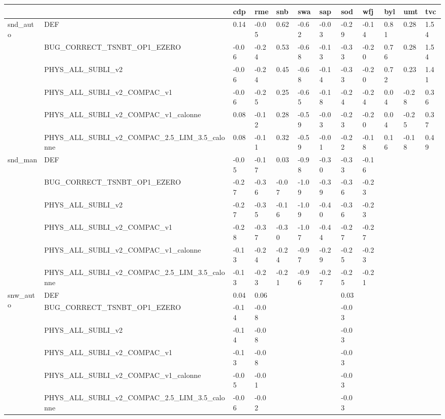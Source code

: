 \begin{tabular}{llllllllllll}
\toprule
 &  & cdp & rme & snb & swa & sap & sod & wfj & byl & umt & tvc \\
\midrule
\multirow[t]{6}{*}{snd_auto} & DEF & 0.14 & -0.05 & 0.62 & -0.62 & -0.03 & -0.29 & -0.14 & 0.81 & 0.28 & 1.54 \\
 & BUG_CORRECT_TSNBT_OP1_EZERO & -0.06 & -0.24 & 0.53 & -0.68 & -0.13 & -0.33 & -0.20 & 0.76 & 0.28 & 1.54 \\
 & PHYS_ALL_SUBLI_v2 & -0.06 & -0.24 & 0.45 & -0.68 & -0.14 & -0.33 & -0.20 & 0.72 & 0.23 & 1.41 \\
 & PHYS_ALL_SUBLI_v2_COMPAC_v1 & -0.06 & -0.25 & 0.25 & -0.65 & -0.18 & -0.24 & -0.24 & 0.04 & -0.28 & 0.36 \\
 & PHYS_ALL_SUBLI_v2_COMPAC_v1_calonne & 0.08 & -0.12 & 0.28 & -0.59 & -0.03 & -0.23 & -0.20 & 0.04 & -0.25 & 0.37 \\
 & PHYS_ALL_SUBLI_v2_COMPAC_2.5_LIM_3.5_calonne & 0.08 & -0.11 & 0.32 & -0.59 & -0.01 & -0.22 & -0.18 & 0.16 & -0.18 & 0.49 \\
\cline{1-12}
\multirow[t]{6}{*}{snd_man} & DEF & -0.05 & -0.17 & 0.03 & -0.98 & -0.30 & -0.33 & -0.16 &  &  &  \\
 & BUG_CORRECT_TSNBT_OP1_EZERO & -0.27 & -0.36 & -0.07 & -1.09 & -0.39 & -0.36 & -0.23 &  &  &  \\
 & PHYS_ALL_SUBLI_v2 & -0.27 & -0.35 & -0.16 & -1.09 & -0.40 & -0.36 & -0.23 &  &  &  \\
 & PHYS_ALL_SUBLI_v2_COMPAC_v1 & -0.28 & -0.37 & -0.30 & -1.07 & -0.44 & -0.27 & -0.27 &  &  &  \\
 & PHYS_ALL_SUBLI_v2_COMPAC_v1_calonne & -0.13 & -0.24 & -0.24 & -0.97 & -0.29 & -0.25 & -0.23 &  &  &  \\
 & PHYS_ALL_SUBLI_v2_COMPAC_2.5_LIM_3.5_calonne & -0.13 & -0.23 & -0.21 & -0.96 & -0.27 & -0.25 & -0.21 &  &  &  \\
\cline{1-12}
\multirow[t]{6}{*}{snw_auto} & DEF & 0.04 & 0.06 &  &  &  & 0.03 &  &  &  &  \\
 & BUG_CORRECT_TSNBT_OP1_EZERO & -0.14 & -0.08 &  &  &  & -0.03 &  &  &  &  \\
 & PHYS_ALL_SUBLI_v2 & -0.14 & -0.08 &  &  &  & -0.03 &  &  &  &  \\
 & PHYS_ALL_SUBLI_v2_COMPAC_v1 & -0.13 & -0.08 &  &  &  & -0.03 &  &  &  &  \\
 & PHYS_ALL_SUBLI_v2_COMPAC_v1_calonne & -0.05 & -0.01 &  &  &  & -0.03 &  &  &  &  \\
 & PHYS_ALL_SUBLI_v2_COMPAC_2.5_LIM_3.5_calonne & -0.06 & -0.02 &  &  &  & -0.03 &  &  &  &  \\

\end{tabular}
